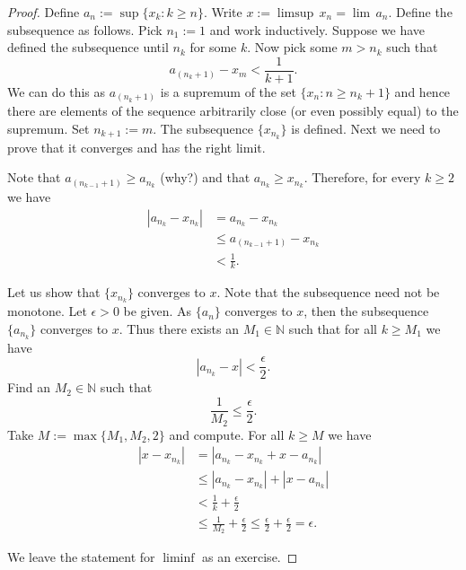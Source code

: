 \documentclass[12pt]{book}
\newcommand{\abs}[1]{\left\lvert {#1} \right\rvert}
\newcommand{\N}{{\mathbb{N}}}
\theoremstyle{plain}
\theoremstyle{remark}
\theoremstyle{definition}
\theoremstyle{exercise}
\theoremstyle{example}
\begin{document}
\begin{proof}
Define $a_n := \sup \{ x_k : k \geq n \}$.
Write
$x := \limsup \, x_n = \lim\, a_n$.  Define the subsequence as follows.
Pick $n_1 := 1$ and work inductively.  Suppose we have
defined the subsequence until $n_k$ for some $k$.  Now pick some $m > n_k$
such that
\begin{equation*}
a_{(n_k+1)} - x_m < \frac{1}{k+1} .
\end{equation*}
We can do this as $a_{(n_k+1)}$ is a supremum of the
set $\{ x_n : n \geq n_k + 1 \}$ and hence there are elements
of the sequence arbitrarily close (or even possibly equal) to the supremum.
Set $n_{k+1} :=  m$.  The subsequence $\{ x_{n_k} \}$ is defined.  Next we
need to prove that it converges and has the right limit.

Note that
$a_{(n_{k-1}+1)} \geq a_{n_k}$ (why?) and that $a_{n_{k}} \geq x_{n_k}$.
Therefore, for every $k \geq 2$ we have
\begin{equation*}
\begin{split}
\abs{a_{n_k} - x_{n_k}} & = 
a_{n_k} - x_{n_k}
\\
& \leq
a_{(n_{k-1}+1)} - x_{n_k}
\\
& < \frac{1}{k} .
\end{split}
\end{equation*}

Let us show that $\{ x_{n_k} \}$ converges to $x$.
Note that the subsequence need not be monotone.  Let $\epsilon > 0$ be given.
As $\{ a_n \}$ converges to $x$, then the subsequence
$\{ a_{n_k} \}$ converges to $x$.
Thus there exists an $M_1 \in \N$
such that for all $k \geq M_1$ we have
\begin{equation*}
\abs{a_{n_k} - x} < \frac{\epsilon}{2} .
\end{equation*}
Find an $M_2 \in \N$ such that
\begin{equation*}
\frac{1}{M_2} \leq \frac{\epsilon}{2}.
\end{equation*}
Take $M := \max \{M_1 , M_2 , 2 \}$ and compute.  For all $k \geq M$
we have
\begin{equation*}
\begin{split}
\abs{x- x_{n_k}} & =
\abs{a_{n_k} - x_{n_k} + x - a_{n_k}}
\\
& \leq \abs{a_{n_k} - x_{n_k}} + \abs{x - a_{n_k}}
\\
& < \frac{1}{k} + \frac{\epsilon}{2}
\\
& \leq \frac{1}{M_2} + \frac{\epsilon}{2} \leq \frac{\epsilon}{2} +
\frac{\epsilon}{2} = \epsilon .
\end{split}
\end{equation*}

We leave the statement for $\liminf$ as an exercise.
\end{proof}
\end{document}
